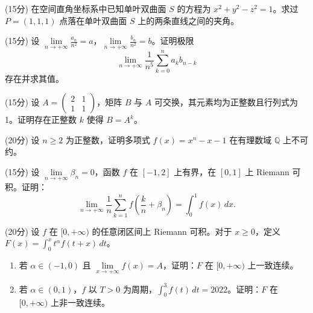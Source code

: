 \documentclass[loose]{ExBook}
\begin{document}
\begin{qitems}
    \begin{bbox}
        \qitem (15分) 在空间直角坐标系中已知单叶双曲面 \( S \) 的方程为 \( x^2 + y^2 - z^2 = 1 \)。求过 \( P = (1, 1, 1) \) 点落在单叶双曲面 \( S \) 上的两条直线之间的夹角。
    \end{bbox}

    \begin{bbox}
        \qitem (15分) 设 \(\lim\limits_{n \to +\infty} \frac{a_n}{n^2} = a\)，\(\lim\limits_{n \to +\infty} \frac{b_n}{n^2} = b\)。证明极限
        \[
        \lim\limits_{n \to +\infty} \frac{1}{n^5} \sum_{k=0}^n a_k b_{n-k}
        \]
        存在并求其值。
    \end{bbox}

    \begin{bbox}
        \qitem (15分) 设 \( A = \begin{pmatrix} 2 & 1 \\ 1 & 1 \end{pmatrix} \)，矩阵 \( B \) 与 \( A \) 可交换，其元素均为正整数且行列式为 1。证明存在正整数 \( k \) 使得 \( B = A^k \)。
    \end{bbox}

    \begin{bbox}
        \qitem (20分) 设 \( n \geq 2 \) 为正整数，证明多项式 \( f(x) = x^n - x - 1 \) 在有理数域 \( \mathbb{Q} \) 上不可约。
    \end{bbox}

    \begin{bbox}
        \qitem (15分) 设 \(\lim\limits_{n \to +\infty} \beta_n = 0\)，函数 \( f \) 在 \([-1, 2]\) 上有界，在 \([0, 1]\) 上 Riemann 可积。证明：
        \[
        \lim\limits_{n \to +\infty} \frac{1}{n} \sum_{k=1}^n f \left( \frac{k}{n} + \beta_n \right) = \int_0^1 f(x) \, dx.
        \]
    \end{bbox}

    \begin{bbox}
        \qitem (20分) 设 \( f \) 在 \([0, +\infty)\) 的任意闭区间上 Riemann 可积。对于 \( x \geq 0 \)，定义 \( F(x) = \int_0^x t^\alpha f(t + x) \, dt \)。
        
        \begin{enumerate}[label=(\arabic*)]
            \item 若 \( \alpha \in (-1, 0) \) 且 \(\lim\limits_{x \to +\infty} f(x) = A\)，证明：\( F \) 在 \([0, +\infty)\) 上一致连续。
            \item 若 \( \alpha \in (0, 1) \)，\( f \) 以 \( T > 0 \) 为周期，\(\int_0^3 f(t) \, dt = 2022\)。证明：\( F \) 在 \([0, +\infty)\) 上非一致连续。
        \end{enumerate}
    \end{bbox}
\end{qitems}
\end{document}

